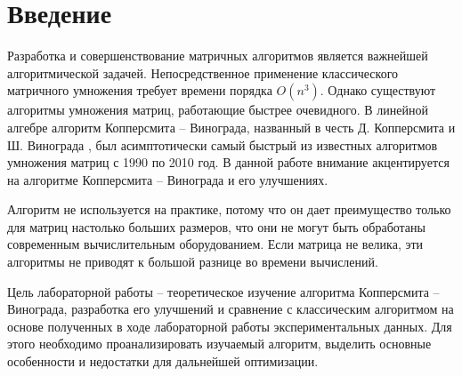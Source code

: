
\chapter*{Введение}

Разработка и совершенствование матричных алгоритмов является важнейшей алгоритмической задачей. Непосредственное применение классического матричного умножения требует времени порядка $O(n^3)$. Однако существуют алгоритмы умножения матриц, работающие быстрее очевидного. В линейной алгебре алгоритм Копперсмита – Винограда\cite{winograd-origin}, названный в честь Д. Копперсмита и Ш. Винограда , был асимптотически самый быстрый из известных алгоритмов умножения матриц с 1990 по 2010 год. В данной работе внимание акцентируется на алгоритме Копперсмита – Винограда и его улучшениях. 

Алгоритм не используется на практике, потому что он дает преимущество только для матриц настолько больших размеров, что они не могут быть обработаны современным вычислительным оборудованием. Если матрица не велика, эти алгоритмы не приводят к большой разнице во времени вычислений. 

Цель лабораторной работы -- теоретическое изучение алгоритма Копперсмита – Винограда, разработка его улучшений и сравнение с классическим алгоритмом на основе полученных в ходе лабораторной работы экспериментальных данных. Для этого необходимо проанализировать изучаемый алгоритм, выделить основные особенности и недостатки для дальнейшей оптимизации. 